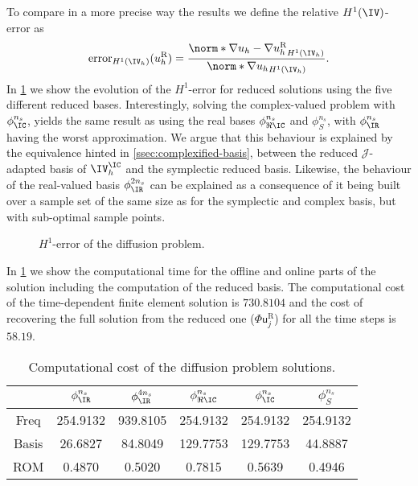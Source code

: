 To compare in a more precise way the results we define the  relative $H^1(\IV)$-error as
\begin{equation} \label{eq:H1-error}
    \textrm{error}_{H^1({\IV_h})}(u_h^{\textrm{R}}) = \frac{\norm*{\nabla u_h - \nabla u_h^{\textrm{R}}}_{H^1({\IV_h})}}{\norm*{\nabla u_h}_{H^1({\IV_h})}}.
\end{equation}
In \cref{fig:dif-error} we show the evolution of the $H^1$-error for reduced solutions using the five different reduced bases. Interestingly, solving the complex-valued problem with $\phi_\IC^{n_s}$, yields the same result as using the real bases $\phi_{\Re\IC}^{n_s}$ and $\phi_{S}^{n_s}$, with $\phi_\IR^{n_s}$ having the worst approximation. We argue that this behaviour is explained by the equivalence hinted in \cref{ssec:complexified-basis}, between the reduced $\mathcal{J}$-adapted basis of $\IV_h^\IC$ and the symplectic reduced basis. Likewise, the behaviour of the real-valued basis $\phi_{\IR}^{2n_s}$ can be explained as a consequence of it being built over a sample set of the same size as for the symplectic and complex basis, but with sub-optimal sample points.
\begin{figure}[H]
	\centering
    \begin{subfigure}[htb!]{0.49\textwidth}
     	\centering
        
    \end{subfigure}
    \begin{subfigure}[htb!]{0.49\textwidth}
        \centering
        
    \end{subfigure}
    \caption{$H^1$-error of the diffusion problem.}
	\label{fig:dif-error}
\end{figure}

In \cref{tab:dif-time} we show the computational time for the offline and online parts of the solution including the computation of the reduced basis. The computational cost of the time-dependent finite element solution is $730.8104$ and the cost of recovering the full solution from the reduced one ($\Phi \bm{\mathsf{u}}_j^{\textrm{R}}$) for all the time steps is $58.19$.
\begin{table}[!htb]
    \centering
    \caption{Computational cost of the diffusion problem solutions.}
    {\small
    \begin{tabular}{cccccc}
        \toprule
        & $\phi_{\IR}^{n_s}$ & $\phi_{\IR}^{4n_s}$ & $\phi_{\Re\IC}^{n_s}$ & $\phi_{\IC}^{n_s}$ & $\phi_{S}^{n_s}$ \\ \midrule  
        Freq & 254.9132 & 939.8105 & 254.9132 & 254.9132 & 254.9132 \\
        Basis & 26.6827 & 84.8049 & 129.7753 & 129.7753 & 44.8887 \\
        ROM & 0.4870 & 0.5020 & 0.7815 & 0.5639 & 0.4946 \\
        \bottomrule
    \end{tabular}}
\label{tab:dif-time}
\end{table}

